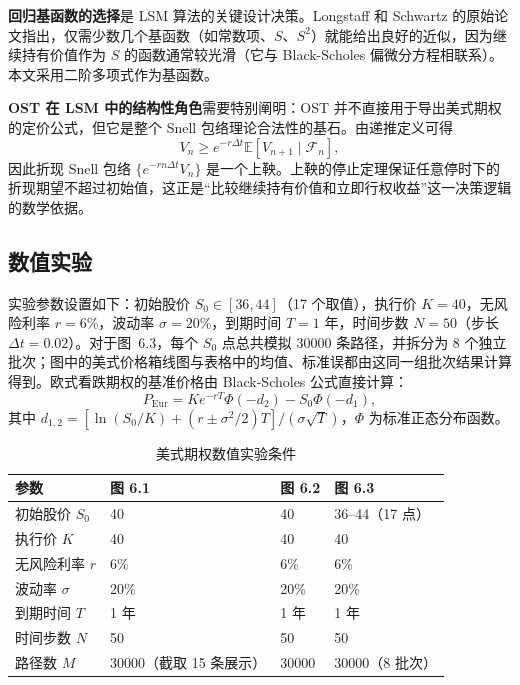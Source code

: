 \textbf{回归基函数的选择}是 LSM 算法的关键设计决策。Longstaff 和 Schwartz 的原始论文指出，仅需少数几个基函数（如常数项、$S$、$S^2$）就能给出良好的近似，因为继续持有价值作为 $S$ 的函数通常较光滑（它与 Black-Scholes 偏微分方程相联系）。本文采用二阶多项式作为基函数。

\textbf{OST 在 LSM 中的结构性角色}需要特别阐明：OST 并不直接用于导出美式期权的定价公式，但它是整个 Snell 包络理论合法性的基石。由递推定义可得
\begin{equation}
  V_n \geqslant
  e^{-r\Delta t}\mathbb{E}[V_{n+1}\mid\mathcal{F}_n],
\end{equation}
因此折现 Snell 包络 $\{e^{-r n\Delta t}V_n\}$ 是一个上鞅。上鞅的停止定理保证任意停时下的折现期望不超过初始值，这正是“比较继续持有价值和立即行权收益”这一决策逻辑的数学依据。

\subsection{数值实验}

实验参数设置如下：初始股价 $S_0 \in [36, 44]$（17 个取值），执行价 $K = 40$，无风险利率 $r = 6\%$，波动率 $\sigma = 20\%$，到期时间 $T = 1$ 年，时间步数 $N = 50$（步长 $\Delta t = 0.02$）。对于图~6.3，每个 $S_0$ 点总共模拟 30000 条路径，并拆分为 8 个独立批次；图中的美式价格箱线图与表格中的均值、标准误都由这同一组批次结果计算得到。欧式看跌期权的基准价格由 Black-Scholes 公式直接计算：
\begin{equation}\label{eq:bs_put}
  P_{\text{Eur}} = K e^{-rT} \Phi(-d_2) - S_0 \Phi(-d_1),
\end{equation}
其中 $d_{1,2} = [\ln(S_0/K) + (r \pm \sigma^2/2)T] / (\sigma\sqrt{T})$，$\Phi$ 为标准正态分布函数\cite{black1973pricing}。

\begin{table}[H]
  \centering
  \caption{美式期权数值实验条件}
  \label{tab:option_params}
  \begin{tabular}{llll}
    \toprule
    参数 & 图 6.1 & 图 6.2 & 图 6.3 \\
    \midrule
    初始股价 $S_0$ & 40 & 40 & 36--44（17 点） \\
    执行价 $K$ & 40 & 40 & 40 \\
    无风险利率 $r$ & 6\% & 6\% & 6\% \\
    波动率 $\sigma$ & 20\% & 20\% & 20\% \\
    到期时间 $T$ & 1 年 & 1 年 & 1 年 \\
    时间步数 $N$ & 50 & 50 & 50 \\
    路径数 $M$ & 30000（截取 15 条展示） & 30000 & 30000（8 批次） \\
    \bottomrule
  \end{tabular}
\end{table}

